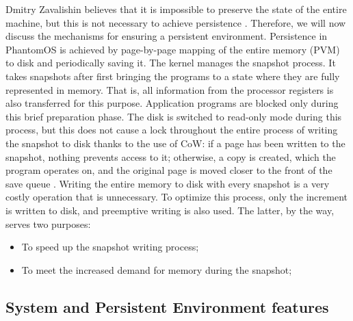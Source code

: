Dmitry Zavalishin believes that it is impossible to preserve the state of the entire machine, but this is not necessary to achieve persistence \cite{Habr_Persistent_Mem}. Therefore, we will now discuss the mechanisms for ensuring a persistent environment. Persistence in PhantomOS is achieved by page-by-page mapping of the entire memory (PVM) to disk and periodically saving it. The kernel manages the snapshot process. It takes snapshots after first bringing the programs to a state where they are fully represented in memory. That is, all information from the processor registers is also transferred for this purpose. Application programs are blocked only during this brief preparation phase. The disk is switched to read-only mode during this process, but this does not cause a lock throughout the entire process of writing the snapshot to disk thanks to the use of CoW: if a page has been written to the snapshot, nothing prevents access to it; otherwise, a copy is created, which the program operates on, and the original page is moved closer to the front of the save queue \cite{Habr_Persistent_Mem, PM_wiki}. Writing the entire memory to disk with every snapshot is a very costly operation that is unnecessary. To optimize this process, only the increment is written to disk, and preemptive writing is also used. The latter, by the way, serves two purposes:
\begin{itemize}
    \item To speed up the snapshot writing process;
    \item To meet the increased demand for memory during the snapshot;
\end{itemize}

\subsection{System and Persistent Environment features}

